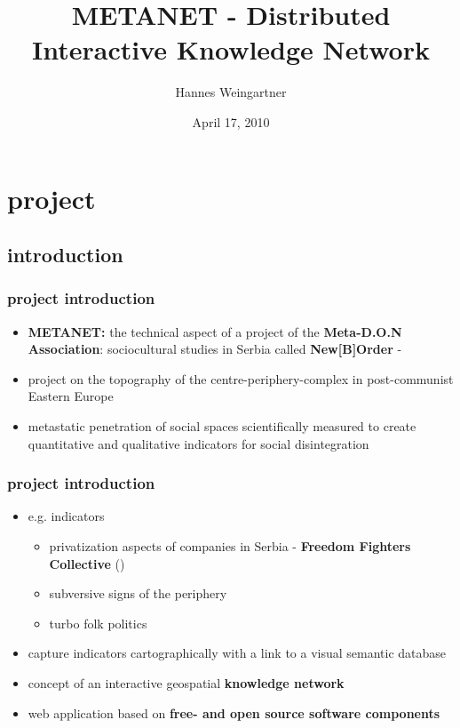 \documentclass[blue]{beamer}
\title{METANET - Distributed Interactive Knowledge Network}
\institute[META-D.O.N]{META-D.O.N\\Association for Cultural Substitution Services}
\author{Hannes Weingartner}
\date{April 17, 2010}
\begin{document}
\frame{\titlepage}

\setcounter{tocdepth}{1}
\frame{\tableofcontents}

\hypersetup{linkcolor=white}


\section{project}
\subsection{introduction}
\frame
{
\frametitle{\textbf{project introduction}}
\begin{itemize}
\item \textbf{METANET:} the technical aspect of a project of the \textbf{Meta-D.O.N Association}: sociocultural studies in Serbia called \textbf{New[B]Order} - 
\item project on the topography of the centre-periphery-complex in post-communist Eastern Europe
\item metastatic penetration of social spaces scientifically measured to create quantitative and qualitative indicators for social disintegration
\end{itemize}
}

\frame
{
\frametitle{\textbf{project introduction}}
\begin{itemize}
	\item e.g. indicators
	\begin{itemize}
		\item privatization aspects of companies in Serbia - \textbf{Freedom Fighters Collective} ()
		\item subversive signs of the periphery
		\item turbo folk politics
	\end{itemize}
	\item capture indicators cartographically with a link to a visual semantic database
	\item concept of an interactive geospatial \textbf{knowledge network}
	\item web application based on \textbf{free- and open source software components}
\end{itemize}
}
\end{document}

